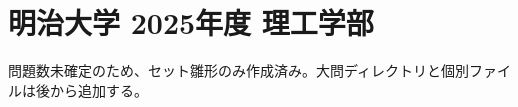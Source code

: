 \documentclass[../../uem_mat_mei_q.tex]{subfiles}
\begin{document}
    \section{明治大学 2025年度 理工学部}

    問題数未確定のため、セット雛形のみ作成済み。大問ディレクトリと個別ファイルは後から追加する。
\end{document}
